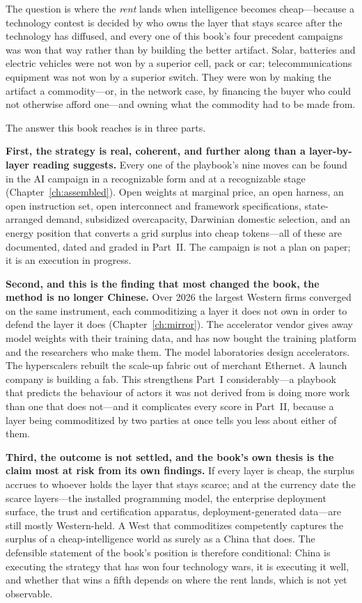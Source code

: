 The question is where the \emph{rent} lands when intelligence becomes cheap---because a technology contest is decided by who owns the layer that stays scarce after the technology has diffused, and every one of this book's four precedent campaigns was won that way rather than by building the better artifact. Solar, batteries and electric vehicles were not won by a superior cell, pack or car; telecommunications equipment was not won by a superior switch. They were won by making the artifact a commodity---or, in the network case, by financing the buyer who could not otherwise afford one---and owning what the commodity had to be made from.

The answer this book reaches is in three parts.

\textbf{First, the strategy is real, coherent, and further along than a layer-by-layer reading suggests.} Every one of the playbook's nine moves can be found in the AI campaign in a recognizable form and at a recognizable stage (Chapter~\ref{ch:assembled}). Open weights at marginal price, an open harness, an open instruction set, open interconnect and framework specifications, state-arranged demand, subsidized overcapacity, Darwinian domestic selection, and an energy position that converts a grid surplus into cheap tokens---all of these are documented, dated and graded in Part~II. The campaign is not a plan on paper; it is an execution in progress.

\textbf{Second, and this is the finding that most changed the book, the method is no longer Chinese.} Over 2026 the largest Western firms converged on the same instrument, each commoditizing a layer it does not own in order to defend the layer it does (Chapter~\ref{ch:mirror}). The accelerator vendor gives away model weights with their training data, and has now bought the training platform and the researchers who make them. The model laboratories design accelerators. The hyperscalers rebuilt the scale-up fabric out of merchant Ethernet. A launch company is building a fab. This strengthens Part~I considerably---a playbook that predicts the behaviour of actors it was not derived from is doing more work than one that does not---and it complicates every score in Part~II, because a layer being commoditized by two parties at once tells you less about either of them.

\textbf{Third, the outcome is not settled, and the book's own thesis is the claim most at risk from its own findings.} If every layer is cheap, the surplus accrues to whoever holds the layer that stays scarce; and at the currency date the scarce layers---the installed programming model, the enterprise deployment surface, the trust and certification apparatus, deployment-generated data---are still mostly Western-held. A West that commoditizes competently captures the surplus of a cheap-intelligence world as surely as a China that does. The defensible statement of the book's position is therefore conditional: China is executing the strategy that has won four technology wars, it is executing it well, and whether that wins a fifth depends on where the rent lands, which is not yet observable.

